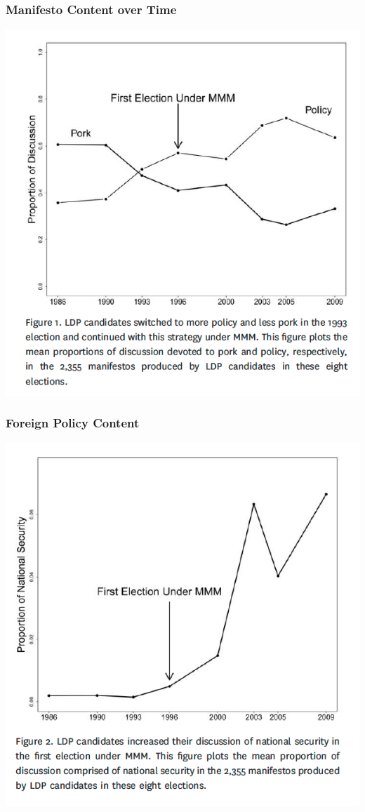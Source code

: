 \documentclass[11pt,compress,professionalfonts]{beamer}
\begin{document}
\begin{frame}[t,fragile]\frametitle{Manifesto Content over Time}
\vspace{10 mm}
\centerline{\includegraphics[scale=.27]{pictures/jpcontent.png}}
\end{frame}


\begin{frame}[t,fragile]\frametitle{Foreign Policy Content}
\vspace{10 mm}
\centerline{\includegraphics[scale=.27]{pictures/jpforeign.png}}
\end{frame}
\end{document}
